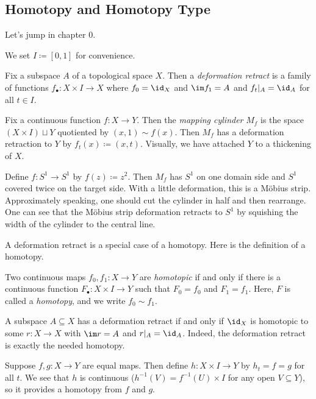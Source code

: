 \documentclass[../notes.tex]{subfiles}
\begin{document}
\subsection{Homotopy and Homotopy Type}
Let's jump in chapter 0.
\begin{notation}
	We set $I\coloneqq[0,1]$ for convenience.
\end{notation}
\begin{definition}
	Fix a subspace $A$ of a topological space $X$. Then a \textit{deformation retract} is a family of functions $f_\bullet\colon X\times I\to X$ where $f_0=\id_X$ and $\im f_1=A$ and $f_t|_A=\id_A$ for all $t\in I$.
\end{definition}
\begin{example}
	Fix a continuous function $f\colon X\to Y$. Then the \textit{mapping cylinder} $M_f$ is the space $(X\times I)\sqcup Y$ quotiented by $(x,1)\sim f(x)$. Then $M_f$ has a deformation retraction to $Y$ by $f_t(x)\coloneqq(x,t)$. Visually, we have attached $Y$ to a thickening of $X$.
\end{example}
\begin{example} \label{ex:mobius-by-cylinder}
	Define $f\colon S^1\to S^1$ by $f(z)\coloneqq z^2$. Then $M_f$ has $S^1$ on one domain side and $S^1$ covered twice on the target side. With a little deformation, this is a M\"obius strip. Approximately speaking, one should cut the cylinder in half and then rearrange. One can see that the M\"obius strip deformation retracts to $S^1$ by squishing the width of the cylinder to the central line.
\end{example}
A deformation retract is a special case of a homotopy. Here is the definition of a homotopy.
\begin{definition}[homotopy]
	Two continuous maps $f_0,f_1\colon X\to Y$ are \textit{homotopic} if and only if there is a continuous function $F_\bullet\colon X\times I\to Y$ such that $F_0=f_0$ and $F_1=f_1$. Here, $F$ is called a \textit{homotopy}, and we write $f_0\sim f_1$.
\end{definition}
\begin{example}
	A subspace $A\subseteq X$ has a deformation retract if and only if $\id_X$ is homotopic to some $r\colon X\to X$ with $\im r=A$ and $r|_A=\id_A$. Indeed, the deformation retract is exactly the needed homotopy.
\end{example}
\begin{example} \label{ex:equal-is-homotopic}
	Suppose $f,g\colon X\to Y$ are equal maps. Then define $h\colon X\times I\to Y$ by $h_t=f=g$ for all $t$. We see that $h$ is continuous ($h^{-1}(V)=f^{-1}(U)\times I$ for any open $V\subseteq Y$), so it provides a homotopy from $f$ and $g$.
\end{example}
\end{document}
